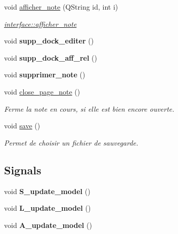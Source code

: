 \begin{DoxyCompactItemize}
void \hyperlink{classinterface_a320051a7a36aa24f53b12df82649f15f}{afficher\+\_\+note} (Q\+String id, int i)
\begin{DoxyCompactList}\small\item\em \hyperlink{classinterface_a320051a7a36aa24f53b12df82649f15f}{interface\+::afficher\+\_\+note} \end{DoxyCompactList}\item 
\mbox{\label{classinterface_ab53612546e2db13b35dca0df8911413e}} 
void {\bfseries supp\+\_\+dock\+\_\+editer} ()
\item 
\mbox{\label{classinterface_a1a6237ea46e9abd0662b8ec19c556f5e}} 
void {\bfseries supp\+\_\+dock\+\_\+aff\+\_\+rel} ()
\item 
\mbox{\label{classinterface_aff7edfeead207b5e0fbbfc275a13a8ab}} 
void {\bfseries supprimer\+\_\+note} ()
\item 
\mbox{\label{classinterface_abe2464522932a5d8ed76d1ba02c9d2c6}} 
void \hyperlink{classinterface_abe2464522932a5d8ed76d1ba02c9d2c6}{close\+\_\+page\+\_\+note} ()
\begin{DoxyCompactList}\small\item\em Ferme la note en cours, si elle est bien encore ouverte. \end{DoxyCompactList}\item 
void \hyperlink{classinterface_a319f133949e2be97a203f725c3f1e565}{save} ()
\begin{DoxyCompactList}\small\item\em Permet de choisir un fichier de sauvegarde. \end{DoxyCompactList}\end{DoxyCompactItemize}
\subsection*{Signals}
\begin{DoxyCompactItemize}
\item 
\mbox{\label{classinterface_a300de30478e2e2616b61abad24bf319a}} 
void {\bfseries S\+\_\+update\+\_\+model} ()
\item 
\mbox{\label{classinterface_a7d829b8bd407c58d27b0849f4891f155}} 
void {\bfseries L\+\_\+update\+\_\+model} ()
\item 
\mbox{\label{classinterface_ad09217bb805eb4405dfc8d0b7cc6e547}} 
void {\bfseries A\+\_\+update\+\_\+model} ()
\end{DoxyCompactItemize}
